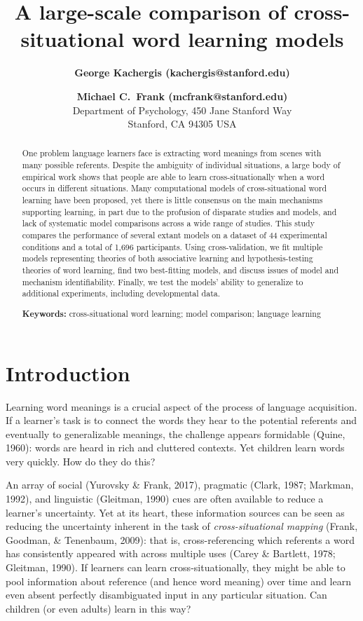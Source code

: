 \documentclass[10pt, letterpaper]{article}
\title{A large-scale comparison of cross-situational word learning
models}
\author{{\large \bf George Kachergis (kachergis@stanford.edu)} \and {\large \bf Michael C.~Frank (mcfrank@stanford.edu)} \\ Department of Psychology, 450 Jane Stanford Way \\ Stanford, CA 94305 USA}
\begin{document}
\maketitle

\begin{abstract}
One problem language learners face is extracting word meanings from
scenes with many possible referents. Despite the ambiguity of individual
situations, a large body of empirical work shows that people are able to
learn cross-situationally when a word occurs in different situations.
Many computational models of cross-situational word learning have been
proposed, yet there is little consensus on the main mechanisms
supporting learning, in part due to the profusion of disparate studies
and models, and lack of systematic model comparisons across a wide range
of studies. This study compares the performance of several extant models
on a dataset of 44 experimental conditions and a total of 1,696
participants. Using cross-validation, we fit multiple models
representing theories of both associative learning and
hypothesis-testing theories of word learning, find two best-fitting
models, and discuss issues of model and mechanism identifiability.
Finally, we test the models' ability to generalize to additional
experiments, including developmental data.

\textbf{Keywords:}
cross-situational word learning; model comparison; language learning
\end{abstract}

\hypertarget{introduction}{%
\section{Introduction}\label{introduction}}

Learning word meanings is a crucial aspect of the process of language
acquisition. If a learner's task is to connect the words they hear to
the potential referents and eventually to generalizable meanings, the
challenge appears formidable (Quine, 1960): words are heard in rich and
cluttered contexts. Yet children learn words very quickly. How do they
do this?

An array of social (Yurovsky \& Frank, 2017), pragmatic (Clark, 1987;
Markman, 1992), and linguistic (Gleitman, 1990) cues are often available
to reduce a learner's uncertainty. Yet at its heart, these information
sources can be seen as reducing the uncertainty inherent in the task of
\emph{cross-situational mapping} (Frank, Goodman, \& Tenenbaum, 2009):
that is, cross-referencing which referents a word has consistently
appeared with across multiple uses (Carey \& Bartlett, 1978; Gleitman,
1990). If learners can learn cross-situationally, they might be able to
pool information about reference (and hence word meaning) over time and
learn even absent perfectly disambiguated input in any particular
situation. Can children (or even adults) learn in this way?
\end{document}
